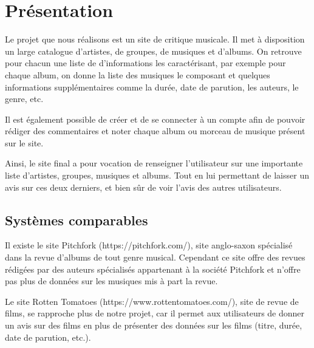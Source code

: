 \section{Présentation}

    \begin{paragraphe}
        Le projet que nous réalisons est un site de critique musicale.
        Il met à disposition un large catalogue d'artistes, de groupes, de musiques et d'albums.
        On retrouve pour chacun une liste de d'informations les caractérisant, par exemple pour chaque album,
        on donne la liste des musiques le composant et quelques informations supplémentaires comme la durée, date de parution, les auteurs, le genre, etc.
    \end{paragraphe}

    \begin{paragraphe}
        Il est également possible de créer et de se connecter à un compte afin de pouvoir rédiger des
        commentaires et noter chaque album ou morceau de musique présent sur le site.
    \end{paragraphe}

    \begin{paragraphe}
        Ainsi, le site final a pour vocation de renseigner l'utilisateur sur une importante liste d'artistes, groupes, musiques et albums.
        Tout en lui permettant de laisser un avis sur ces deux derniers, et bien sûr de voir l'avis des autres utilisateurs.
    \end{paragraphe}

    \subsection{Systèmes comparables}

        \begin{paragraphe}
            Il existe le site Pitchfork (https://pitchfork.com/), site anglo-saxon
            spécialisé dans la revue d’albums de tout genre musical. Cependant ce site
            offre des revues rédigées par des auteurs spécialisés appartenant à la
            société Pitchfork et n’offre pas plus de données sur les musiques mis à part
            la revue.
        \end{paragraphe}

        \begin{paragraphe}
            Le site Rotten Tomatoes (https://www.rottentomatoes.com/), site de revue de
            films, se rapproche plus de notre projet, car il permet aux utilisateurs de
            donner un avis sur des films en plus de présenter des données sur les films
            (titre, durée, date de parution, etc.).
        \end{paragraphe}

